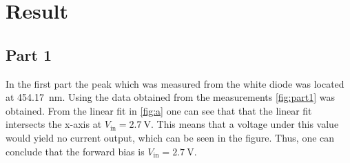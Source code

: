 \section{Result}
\subsection{Part 1}
In the first part the peak which was measured from the white diode was located at \SI{454.17}{\nano\m}. Using the data obtained from the measurements \autoref{fig:part1} was obtained. From the linear fit in \autoref{fig:a} one can see that that the linear fit intersects the x-axis at $V_\text{in}=\SI{2.7}{\V}$. This means that a voltage under this value would yield no current output, which can be seen in the figure. Thus, one can conclude that the forward bias is $V_\text{in}=\SI{2.7}{\V}$. 

